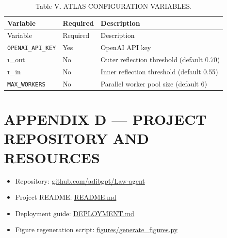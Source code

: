 \documentclass[
  twocolumn]{article}
\providecommand{\tightlist}{%
  \setlength{\itemsep}{0pt}\setlength{\parskip}{0pt}}
\begin{document}
\begin{longtable}[]{@{}lll@{}}
\caption{Table V. ATLAS CONFIGURATION VARIABLES.}\tabularnewline
\toprule\noalign{}
Variable & Required & Description \\
\midrule\noalign{}
\endfirsthead
\toprule\noalign{}
Variable & Required & Description \\
\midrule\noalign{}
\endhead
\bottomrule\noalign{}
\endlastfoot
\texttt{OPENAI\_API\_KEY} & Yes & OpenAI API key \\
τ\_out & No & Outer reflection threshold (default 0.70) \\
τ\_in & No & Inner reflection threshold (default 0.55) \\
\texttt{MAX\_WORKERS} & No & Parallel worker pool size (default 6) \\
\end{longtable}

\section{APPENDIX D --- PROJECT REPOSITORY AND
RESOURCES}\label{appendix-d-project-repository-and-resources}

\begin{itemize}
\tightlist
\item
  Repository:
  \href{https://github.com/adibgpt/Law-agent}{github.com/adibgpt/Law-agent}
\item
  Project README: \url{README.md}
\item
  Deployment guide: \url{DEPLOYMENT.md}
\item
  Figure regeneration script: \url{figures/generate_figures.py}
\end{itemize}
\end{document}
